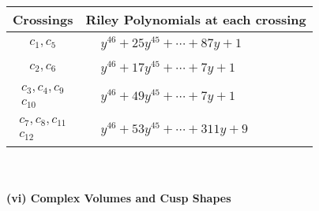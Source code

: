 \documentclass[1p]{elsarticle_modified}
\theoremstyle{definition}
\begin{document}
\begin{tabular}{m{50pt}|m{274pt}}
Crossings & \hspace{64pt}Riley Polynomials at each crossing \\
\hline $$\begin{aligned}c_{1},c_{5}\end{aligned}$$&$\begin{aligned}
&y^{46}+25 y^{45}+\cdots+87 y+1
\end{aligned}$\\
\hline $$\begin{aligned}c_{2},c_{6}\end{aligned}$$&$\begin{aligned}
&y^{46}+17 y^{45}+\cdots+7 y+1
\end{aligned}$\\
\hline $$\begin{aligned}c_{3},c_{4},c_{9}\\c_{10}\end{aligned}$$&$\begin{aligned}
&y^{46}+49 y^{45}+\cdots+7 y+1
\end{aligned}$\\
\hline $$\begin{aligned}c_{7},c_{8},c_{11}\\c_{12}\end{aligned}$$&$\begin{aligned}
&y^{46}+53 y^{45}+\cdots+311 y+9
\end{aligned}$\\
\hline
\end{tabular}\\~\\
\newpage\flushleft \textbf{(vi) Complex Volumes and Cusp Shapes}
\end{document}
